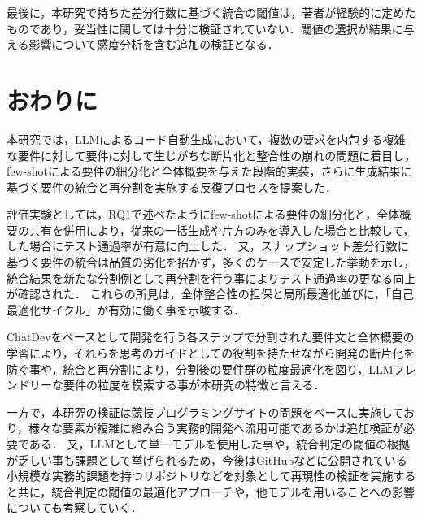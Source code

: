 \documentclass[submit,techrep,noauthor]{ipsj}
\begin{document}
最後に，本研究で持ちた差分行数に基づく統合の閾値は，著者が経験的に定めたものであり，妥当性に関しては十分に検証されていない．閾値の選択が結果に与える影響について感度分析を含む追加の検証となる．

\section{おわりに}
\label{sec:conclusion}
本研究では，LLMによるコード自動生成において，複数の要求を内包する複雑な要件に対して要件に対して生じがちな断片化と整合性の崩れの問題に着目し，few-shotによる要件の細分化と全体概要を与えた段階的実装，さらに生成結果に基づく要件の統合と再分割を実施する反復プロセスを提案した．

評価実験としては，RQ1で述べたようにfew-shotによる要件の細分化と，全体概要の共有を併用により，従来の一括生成や片方のみを導入した場合と比較して，した場合にテスト通過率が有意に向上した．
又，スナップショット差分行数に基づく要件の統合は品質の劣化を招かず，多くのケースで安定した挙動を示し，統合結果を新たな分割例として再分割を行う事によりテスト通過率の更なる向上が確認された．
これらの所見は，全体整合性の担保と局所最適化並びに，「自己最適化サイクル」が有効に働く事を示唆する．

ChatDevをベースとして開発を行う各ステップで分割された要件文と全体概要の学習により，それらを思考のガイドとしての役割を持たせながら開発の断片化を防ぐ事や，統合と再分割により，分割後の要件群の粒度最適化を図り，LLMフレンドリーな要件の粒度を模索する事が本研究の特徴と言える．

一方で，本研究の検証は競技プログラミングサイトの問題をベースに実施しており，様々な要素が複雑に絡み合う実務的開発へ流用可能であるかは追加検証が必要である．
又，LLMとして単一モデルを使用した事や，統合判定の閾値の根拠が乏しい事も課題として挙げられるため，今後はGitHubなどに公開されている小規模な実務的課題を持つリポジトリなどを対象として再現性の検証を実施すると共に，統合判定の閾値の最適化アプローチや，他モデルを用いることへの影響についても考察していく．




\end{document}
